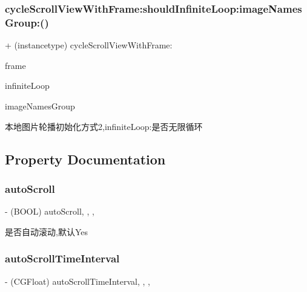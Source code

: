 \subsubsection{\texorpdfstring{cycle\+Scroll\+View\+With\+Frame\+:should\+Infinite\+Loop\+:image\+Names\+Group\+:()}{cycleScrollViewWithFrame:shouldInfiniteLoop:imageNamesGroup:()}\hspace{0.1cm}{\footnotesize\ttfamily [3/3]}}
{\footnotesize\ttfamily + (instancetype) cycle\+Scroll\+View\+With\+Frame\+: \begin{DoxyParamCaption}\item[{(C\+G\+Rect)}]{frame }\item[{shouldInfiniteLoop:(B\+O\+OL)}]{infinite\+Loop }\item[{imageNamesGroup:(N\+S\+Array $\ast$)}]{image\+Names\+Group }\end{DoxyParamCaption}}

本地图片轮播初始化方式2,infinite\+Loop\+:是否无限循环 

\subsection{Property Documentation}
\mbox{\label{interface_s_d_cycle_scroll_view_a4f1a5064309cd90c10e9ea62def66c0a}} 
\subsubsection{\texorpdfstring{auto\+Scroll}{autoScroll}}
{\footnotesize\ttfamily -\/ (B\+O\+OL) auto\+Scroll\hspace{0.3cm}{\ttfamily [read]}, {\ttfamily [write]}, {\ttfamily [nonatomic]}, {\ttfamily [assign]}}

是否自动滚动,默认\+Yes \mbox{\label{interface_s_d_cycle_scroll_view_a2d66927f0b94893660eb67f92445b3ec}} 
\subsubsection{\texorpdfstring{auto\+Scroll\+Time\+Interval}{autoScrollTimeInterval}}
{\footnotesize\ttfamily -\/ (C\+G\+Float) auto\+Scroll\+Time\+Interval\hspace{0.3cm}{\ttfamily [read]}, {\ttfamily [write]}, {\ttfamily [nonatomic]}, {\ttfamily [assign]}}

